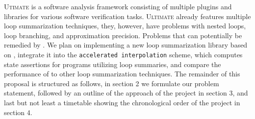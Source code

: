 \textsc{Utimate}\cite{Zitat02} is a software analysis framework consisting of multiple plugins and libraries for various software verification tasks. \textsc{Ultimate} already features multiple loop summarization techniques, they, however, have problems with nested loops, loop branching, and approximation precision. Problems that can potentially be remedied by \qvasrs. We plan on implementing a new loop summarization library based on \qvasrs, integrate it into the \texttt{accelerated interpolation} scheme, which computes state assertions for programs utilizing loop summaries, and compare the performance of \qvasrs to other loop summarization techniques.
The remainder of this proposal is structured as follows, in section 2 we formulate our problem statement, followed by an outline of the approach of the project in section 3, and last but not least a timetable showing the chronological order of the project in section 4.
